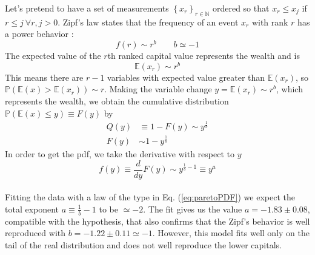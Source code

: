 Let's pretend to have a set of measurements $\left\{x_r\right\}_{r \in \mathbb{N}}$ ordered so that $x_r \leq x_j$ if $r \leq j \ \forall r,j > 0$.
Zipf's law states that the frequency of an event $x_r$ with rank $r$ has a power behavior \cite{zipf}:
\begin{equation}
    f(r) \sim r^b \ \ \ \ \ \ \ \ \ b \simeq -1
    \label{eq:zipf}
\end{equation}
The expected value of the $r$th ranked capital value represents the wealth and is
\begin{equation*}
    \mathbb{E}(x_r)\sim r^b
\end{equation*}
This means there are $r - 1$ variables with expected value greater than $\mathbb{E}(x_r)$, so $\mathbb{P}\left(\mathbb{E}(x) > \mathbb{E}(x_r)\right) \sim r$.
Making the variable change $y = \mathbb{E}(x_r) \sim r^b$, which represents the wealth, we obtain the cumulative distribution $\mathbb{P}\left(\mathbb{E}(x) \leq y\right) \equiv F(y)$ by
\begin{equation*}
    \begin{split}
        Q(y) &\equiv 1 - F(y) \sim y^{\frac{1}{b}} \\
        F(y) &\sim 1 - y^{\frac{1}{b}}
    \end{split}
\end{equation*}
In order to get the pdf, we take the derivative with respect to $y$
\begin{equation}
    f(y) \equiv \frac{d}{dy}F(y) \sim y^{\frac{1}{b} - 1} \equiv y^a
    \label{eq:paretoPDF}
\end{equation}
\\Fitting the data with a law of the type in Eq. (\ref{eq:paretoPDF}) we expect the total exponent $a \equiv \frac{1}{b} - 1$ to be $\simeq -2$.
The fit gives us the value $a = -1.83 \pm 0.08$, compatible with the hypothesis, that also confirms that the Zipf's behavior is well reproduced with $b = -1.22 \pm 0.11 \simeq -1$.
However, this model fits well only on the tail of the real distribution and does not well reproduce the lower capitals. \\ \\
